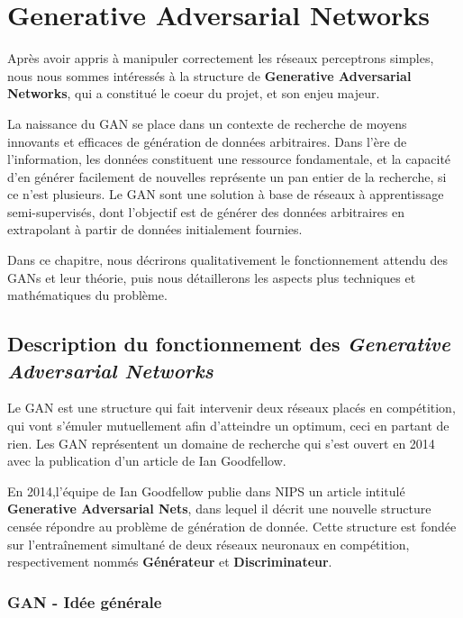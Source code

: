 \chapter{Generative Adversarial Networks}

Après avoir appris à manipuler correctement les réseaux perceptrons simples, nous nous sommes intéressés à la structure de \textbf{Generative Adversarial Networks}, qui a constitué le coeur du projet, et son enjeu majeur. 

La naissance du GAN se place dans un contexte de recherche de moyens innovants et efficaces de génération de données arbitraires. Dans l'ère de l'information, les données constituent une ressource fondamentale, et la capacité d'en générer facilement de nouvelles représente un pan entier de la recherche, si ce n'est plusieurs. Le GAN sont une solution à base de réseaux à apprentissage semi-supervisés, dont l'objectif est de générer des données arbitraires en extrapolant à partir de données initialement fournies.

Dans ce chapitre, nous décrirons qualitativement le fonctionnement attendu des GANs et leur théorie, puis nous détaillerons les aspects plus techniques et mathématiques du problème. 

\section{Description du fonctionnement des \textit{Generative Adversarial Networks}}

Le GAN est une structure qui fait intervenir deux réseaux placés en compétition, qui vont s'émuler mutuellement afin d'atteindre un optimum, ceci en partant de rien. Les GAN représentent un domaine de recherche qui s'est ouvert en 2014 avec la publication d'un article de Ian Goodfellow.

En 2014,l'équipe de Ian Goodfellow publie dans NIPS un article intitulé \textbf{Generative Adversarial Nets}, dans lequel il décrit une nouvelle structure censée répondre au problème de génération de donnée. Cette structure est fondée sur l'entraînement simultané de deux réseaux neuronaux en compétition, respectivement nommés \textbf{Générateur} et \textbf{Discriminateur}.  


\subsection{GAN - Idée générale}

